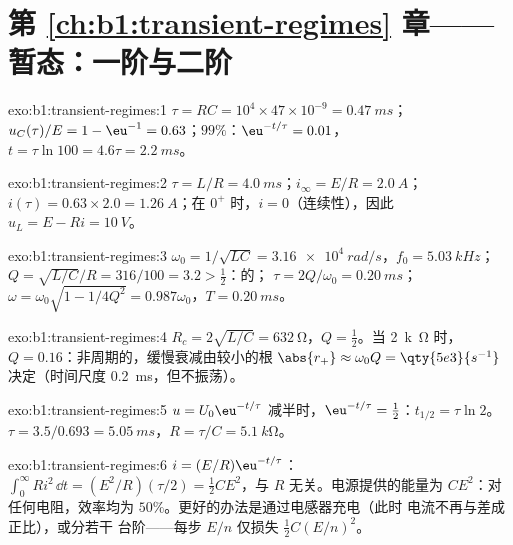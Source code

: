 \section*{第 \ref{ch:b1:transient-regimes} 章——暂态：一阶与二阶}

\begin{solution}{exo:b1:transient-regimes:1}
$\tau = RC = 10^4 \times 47\times10^{-9} = \qty{0.47}{ms}$；$u_C(\tau)/E
= 1 - \eu^{-1} = 0.63$；$99\%$：$\eu^{-t/\tau} = 0.01$，$t = \tau\ln 100
= 4.6\tau = \qty{2.2}{ms}$。
\end{solution}

\begin{solution}{exo:b1:transient-regimes:2}
$\tau = L/R = \qty{4.0}{ms}$；$i_\infty = E/R = \qty{2.0}{A}$；$i(\tau) =
0.63 \times 2.0 = \qty{1.26}{A}$；在 $0^+$ 时，$i = 0$（连续性），因此
$u_L = E - Ri = \qty{10}{V}$。
\end{solution}

\begin{solution}{exo:b1:transient-regimes:3}
$\omega_0 = 1/\sqrt{LC} = \qty{3.16e4}{rad/s}$，$f_0 = \qty{5.03}{kHz}$；
$Q = \sqrt{L/C}/R = 316/100 = 3.2 > \tfrac12$：的；
$\tau = 2Q/\omega_0 = \qty{0.20}{ms}$；$\omega = \omega_0\sqrt{1 - 1/4Q^2}
= 0.987\omega_0$，$T = \qty{0.20}{ms}$。
\end{solution}

\begin{solution}{exo:b1:transient-regimes:4}
$R_c = 2\sqrt{L/C} = \qty{632}{\ohm}$，$Q = \tfrac12$。当 \qty{2}{k\ohm} 时，
$Q = 0.16$：非周期的，缓慢衰减由较小的根
$\abs{r_+} \approx \omega_0 Q = \qty{5e3}{s^{-1}}$ 决定（时间尺度
\qty{0.2}{ms}，但不振荡）。
\end{solution}

\begin{solution}{exo:b1:transient-regimes:5}
$u = U_0\eu^{-t/\tau}$ 减半时，$\eu^{-t/\tau} = \tfrac12$：$t_{1/2}
= \tau\ln 2$。$\tau = 3.5/0.693 = \qty{5.05}{ms}$，$R = \tau/C =
\qty{5.1}{k\ohm}$。
\end{solution}

\begin{solution}{exo:b1:transient-regimes:6}
$i = (E/R)\eu^{-t/\tau}$：$\int_0^\infty Ri^2\,\dd t = (E^2/R)(\tau/2) =
\tfrac12 CE^2$，与 $R$ 无关。电源提供的能量为 $CE^2$：对任何电阻，效率均为
$50\%$。更好的办法是通过电感器充电（此时
电流不再与差成正比），或分若干
台阶——每步 $E/n$ 仅损失 $\tfrac12 C(E/n)^2$。
\end{solution}

